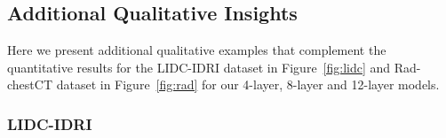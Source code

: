 

\subsection{Additional Qualitative Insights}
\label{ap}
Here we present additional qualitative examples that complement the quantitative results for the LIDC-IDRI dataset in Figure~\ref{fig:lidc} and Rad-chestCT dataset in Figure~\ref{fig:rad} for our 4-layer, 8-layer and 12-layer models. 
\subsubsection{LIDC-IDRI}

